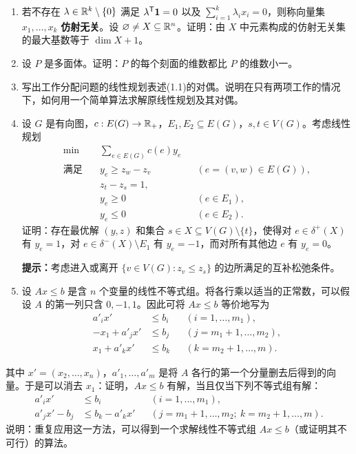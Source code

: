 \begin{enumerate}[label=\arabic*.]
\item 若不存在 $\lambda\in\mathbb R^k\setminus\{0\}$ 满足 $\lambda^{\mathsf T}\mathbf1=0$ 以及 $\sum_{i=1}^k\lambda_i x_i=0$，则称向量集 $x_1,\ldots,x_k$ \textbf{仿射无关}。设 $\varnothing\ne X\subseteq\mathbb R^n$。证明：由 $X$ 中元素构成的仿射无关集的最大基数等于 $\dim X+1$。
\item 设 $P$ 是多面体。证明：$P$ 的每个刻面的维数都比 $P$ 的维数小一。
\item 写出工作分配问题的线性规划表述(1.1)的对偶。说明在只有两项工作的情况下，如何用一个简单算法求解原线性规划及其对偶。
\item 设 $G$ 是有向图，$c:E(G)\to\mathbb R_+$，$E_1,E_2\subseteq E(G)$，$s,t\in V(G)$。考虑线性规划
\[
\begin{aligned}
\min\quad &\sum_{e\in E(G)}c(e)y_e\\
\text{满足}\quad &y_e\ge z_w-z_v &&(e=(v,w)\in E(G)),\\
&z_t-z_s=1,\\
&y_e\ge0 &&(e\in E_1),\\
&y_e\le0 &&(e\in E_2).
\end{aligned}
\]
证明：存在最优解 $(y,z)$ 和集合 $s\in X\subseteq V(G)\setminus\{t\}$，使得对 $e\in\delta^+(X)$ 有 $y_e=1$，对 $e\in\delta^-(X)\setminus E_1$ 有 $y_e=-1$，而对所有其他边 $e$ 有 $y_e=0$。

\textbf{提示：}考虑进入或离开 $\{v\in V(G):z_v\le z_s\}$ 的边所满足的互补松弛条件。
\item 设 $Ax\le b$ 是含 $n$ 个变量的线性不等式组。将各行乘以适当的正常数，可以假设 $A$ 的第一列只含 $0,-1,1$。因此可将 $Ax\le b$ 等价地写为
\[
\begin{aligned}
a'_i x'&\le b_i &&(i=1,\ldots,m_1),\\
-x_1+a'_j x'&\le b_j &&(j=m_1+1,\ldots,m_2),\\
x_1+a'_k x'&\le b_k &&(k=m_2+1,\ldots,m).
\end{aligned}
\]
\end{enumerate}

\noindent 其中 $x'=(x_2,\ldots,x_n)$，$a'_1,\ldots,a'_m$ 是将 $A$ 各行的第一个分量删去后得到的向量。于是可以消去 $x_1$：证明，$Ax\le b$ 有解，当且仅当下列不等式组有解：
\[
\begin{aligned}
a'_i x'&\le b_i &&(i=1,\ldots,m_1),\\
a'_j x'-b_j&\le b_k-a'_k x'
&&(j=m_1+1,\ldots,m_2;\ k=m_2+1,\ldots,m).
\end{aligned}
\]
说明：重复应用这一方法，可以得到一个求解线性不等式组 $Ax\le b$（或证明其不可行）的算法。

